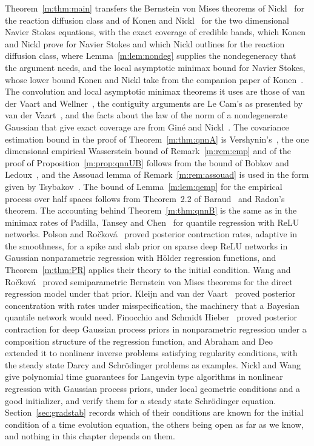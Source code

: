 Theorem~\ref{m:thm:main} transfers the Bernstein von Mises theorems of Nickl~\cite{nicklbvm2024} for the reaction diffusion class and of Konen and Nickl~\cite{konennickl2026} for the two dimensional Navier Stokes equations, with the exact coverage of credible bands, which Konen and Nickl prove for Navier Stokes and which Nickl outlines for the reaction diffusion class, where Lemma~\ref{m:lem:nondeg} supplies the nondegeneracy that the argument needs, and the local asymptotic minimax bound for Navier Stokes, whose lower bound Konen and Nickl take from the companion paper of Konen~\cite{konen2026}. The convolution and local asymptotic minimax theorems it uses are those of van der Vaart and Wellner~\cite{vandervaartwellner2023}, the contiguity arguments are Le Cam's as presented by van der Vaart~\cite{vandervaart1998}, and the facts about the law of the norm of a nondegenerate Gaussian that give exact coverage are from Gin\'e and Nickl~\cite{ginenickl2016}. The covariance estimation bound in the proof of Theorem~\ref{m:thm:qnnA} is Vershynin's~\cite{vershynin2018}, the one dimensional empirical Wasserstein bound of Remark~\ref{m:rem:emp} and of the proof of Proposition~\ref{m:prop:qnnUB} follows from the bound of Bobkov and Ledoux~\cite[Theorem 3.2]{bobkovledoux2019}, and the Assouad lemma of Remark~\ref{m:rem:assouad} is used in the form given by Tsybakov~\cite{tsybakov2009}. The bound of Lemma~\ref{m:lem:qemp} for the empirical process over half spaces follows from Theorem~2.2 of Baraud~\cite{baraud2016} and Radon's theorem. The accounting behind Theorem~\ref{m:thm:qnnB} is the same as in the minimax rates of Padilla, Tansey and Chen~\cite{padilla2022} for quantile regression with ReLU networks. Polson and Ro\v{c}kov\'a~\cite{polsonrockova2018} proved posterior contraction rates, adaptive in the smoothness, for a spike and slab prior on sparse deep ReLU networks in Gaussian nonparametric regression with H\"older regression functions, and Theorem~\ref{m:thm:PR} applies their theory to the initial condition. Wang and Ro\v{c}kov\'a~\cite{wangrockova2020} proved semiparametric Bernstein von Mises theorems for the direct regression model under that prior. Kleijn and van der Vaart~\cite{kleijnvandervaart2006} proved posterior concentration with rates under misspecification, the machinery that a Bayesian quantile network would need. Finocchio and Schmidt Hieber~\cite{finocchioschmidthieber2023} proved posterior contraction for deep Gaussian process priors in nonparametric regression under a composition structure of the regression function, and Abraham and Deo~\cite{abrahamdeo2023} extended it to nonlinear inverse problems satisfying regularity conditions, with the steady state Darcy and Schr\"odinger problems as examples. Nickl and Wang~\cite{nicklwang2024} give polynomial time guarantees for Langevin type algorithms in nonlinear regression with Gaussian process priors, under local geometric conditions and a good initializer, and verify them for a steady state Schr\"odinger equation. Section~\ref{sec:gradstab} records which of their conditions are known for the initial condition of a time evolution equation, the others being open as far as we know, and nothing in this chapter depends on them.

